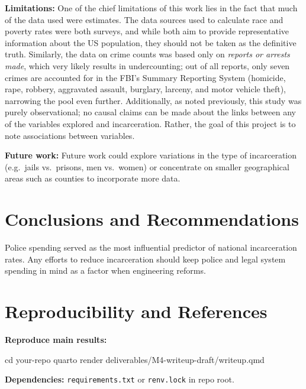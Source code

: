 \documentclass[
  letterpaper,
  DIV=11,
  numbers=noendperiod]{scrartcl}
\newenvironment{Shaded}{\begin{snugshade}}{\end{snugshade}}
\newcommand{\BuiltInTok}[1]{\textcolor[rgb]{0.00,0.23,0.31}{#1}}
\newcommand{\ExtensionTok}[1]{\textcolor[rgb]{0.00,0.23,0.31}{#1}}
\newcommand{\NormalTok}[1]{\textcolor[rgb]{0.00,0.23,0.31}{#1}}
\begin{document}
\textbf{Limitations:} One of the chief limitations of this work lies in
the fact that much of the data used were estimates. The data sources
used to calculate race and poverty rates were both surveys, and while
both aim to provide representative information about the US population,
they should not be taken as the definitive truth. Similarly, the data on
crime counts was based only on \emph{reports or arrests made}, which
very likely results in undercounting; out of all reports, only seven
crimes are accounted for in the FBI's Summary Reporting System
(homicide, rape, robbery, aggravated assault, burglary, larceny, and
motor vehicle theft), narrowing the pool even further. Additionally, as
noted previously, this study was purely observational; no causal claims
can be made about the links between any of the variables explored and
incarceration. Rather, the goal of this project is to note associations
between variables.

\textbf{Future work:} Future work could explore variations in the type
of incarceration (e.g.~jails vs.~prisons, men vs.~women) or concentrate
on smaller geographical areas such as counties to incorporate more data.

\section{Conclusions and
Recommendations}\label{conclusions-and-recommendations}

Police spending served as the most influential predictor of national
incarceration rates. Any efforts to reduce incarceration should keep
police and legal system spending in mind as a factor when engineering
reforms.

\section{Reproducibility and
References}\label{reproducibility-and-references}

\textbf{Reproduce main results:}

\begin{Shaded}
\begin{Highlighting}[]
\BuiltInTok{cd}\NormalTok{ your{-}repo}
\ExtensionTok{quarto}\NormalTok{ render deliverables/M4{-}writeup{-}draft/writeup.qmd}
\end{Highlighting}
\end{Shaded}

\textbf{Dependencies:} \texttt{requirements.txt} or \texttt{renv.lock}
in repo root.
\end{document}
